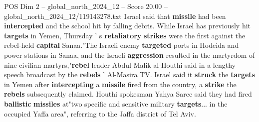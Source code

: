 \begin{textsample}{POS Dim 2 – global\_north\_2024\_12 – Score 20.00 – global\_north\_2024\_12/119143278.txt}
Israel said that \textbf{missile} had been \textbf{intercepted} and the school hit by falling debris.
While Israel has previously hit \textbf{targets} in Yemen, Thursday ' s \textbf{retaliatory} \textbf{strikes} were the first against the rebel-held \textbf{capital} Sanaa."The Israeli enemy \textbf{targeted} ports in Hodeida and power stations in Sanaa, and the Israeli \textbf{aggression} resulted in the martyrdom of nine civilian martyrs,"\textbf{rebel} leader Abdul Malik al-Houthi said in a lengthy speech broadcast by the \textbf{rebels} ' Al-Masira TV.
Israel said it \textbf{struck} the \textbf{targets} in Yemen after \textbf{intercepting} a \textbf{missile} fired from the country, a \textbf{strike} the \textbf{rebels} subsequently claimed.
Houthi spokesman Yahya Saree said they had fired \textbf{ballistic} \textbf{missiles} at"two specific and sensitive military \textbf{targets}... in the occupied Yaffa area", referring to the Jaffa district of Tel Aviv.

\end{textsample}
